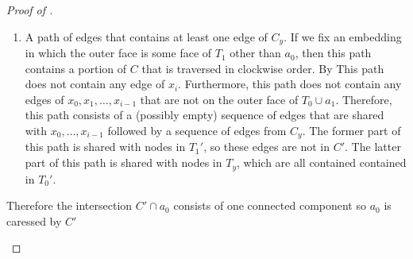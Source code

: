 \documentclass{patmorin}
\begin{document}
\begin{proof}[Proof of ]
\begin{enumerate}
\begin{enumerate}
     \item A path of edges that contains at least one edge of $C_y$. If
     we fix an embedding in which the outer face is some face of $T_1$
     other than $a_0$, then this path contains a portion of $C$ that
     is traversed in clockwise order. By 
     This path does not contain any edge of $x_i$.  Furthermore, this
     path does not contain any edges of $x_0,x_1,\ldots,x_{i-1}$ that
     are not on the outer face of $T_0\cup a_1$.  Therefore, this path
     consists of a (possibly empty) sequence of edges that are shared with
     $x_0,\ldots,x_{i-1}$ followed by a sequence of edges from $C_y$. The
     former part of this path is shared with nodes in $T_1'$, so these
     edges are not in $C'$.  The latter part of this path is shared with
     nodes in $T_y$, which are all contained contained in $T_0'$.
  \end{enumerate} 
  Therefore the intersection $C'\cap a_0$ consists of one connected
  component so $a_0$ is caressed by $C'$
\end{enumerate}
%  
%
%
%

\end{proof}
\end{document}
